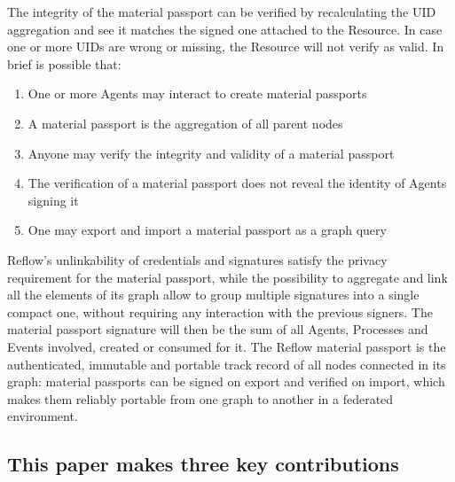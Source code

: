 \documentclass[twocolumn]{article}
\begin{document}
The integrity of the material passport can be verified by recalculating
the UID aggregation and see it matches the signed one attached to the
Resource. In case one or more UIDs are wrong or missing, the Resource
will not verify as valid. In brief is possible that:

\begin{enumerate}
  \item One or more Agents may interact to create material passports
  \item A material passport is the aggregation of all parent nodes
  \item Anyone may verify the integrity and validity of a material passport
  \item The verification of a material passport does not reveal the identity of Agents signing it
  \item One may export and import a material passport as a graph query
\end{enumerate}

Reflow's unlinkability of credentials and signatures satisfy the privacy
requirement for the material passport, while the possibility to
aggregate and link all the elements of its graph allow to group multiple
signatures into a single compact one, without requiring any interaction
with the previous signers. The material passport signature will then be
the sum of all Agents, Processes and Events involved, created or
consumed for it. The Reflow material passport is the authenticated,
immutable and portable track record of all nodes connected in its graph:
material passports can be signed on export and verified on import, which
makes them reliably portable from one graph to another in a federated
environment.

\subsection*{This paper makes three key contributions}
\end{document}
